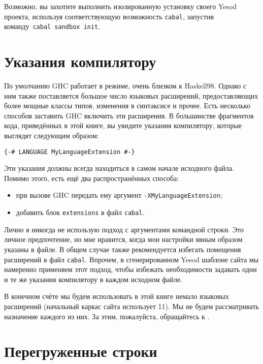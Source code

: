\begin{remark}
    Возможно, вы захотите выполнить изолированную установку своего Yesod
    проекта, используя соответствующую возможность \texttt{cabal}, запустив
    команду~\texttt{cabal~sandbox~init}.
\end{remark}

\section{Указания компилятору}

По умолчанию GHC работает в режиме, очень близком к Haskell98. Однако с ним также поставляется большое число языковых расширений, предоставляющих более мощные классы типов, изменения в синтаксисе и прочее. Есть несколько способов заставить GHC включить эти расширения. В большинстве фрагментов кода, приведённых в этой книге, вы увидите указания компилятору, которые выглядят следующим образом:

\begin{lstlisting}
{-# LANGUAGE MyLanguageExtension #-}
\end{lstlisting}

Эти указания должны всегда находиться в самом начале исходного файла. Помимо этого, есть ещё два распространённых способа:
\begin{itemize}
\item при вызове GHC передать ему аргумент \lstinline'-XMyLanguageExtension';
\item добавить блок \texttt{extensions} в файл \texttt{cabal}.
\end{itemize}

Лично я никогда не использую подход с аргументами командной строки. Это личное предпочтение, но мне нравится, когда мои настройки явным образом указаны в файле. В общем случае также рекомендуется избегать помещения расширений в файл \texttt{cabal}. Впрочем, в сгенерированном Yesod шаблоне сайта мы намеренно применяем этот подход, чтобы избежать необходимости задавать одни и те же указания компилятору в каждом исходном файле.

В конечном счёте мы будем использовать в этой книге немало языковых расширений (начальный каркас сайта использует 11). Мы не будем рассматривать назначение каждого из них. За этим, пожалуйста, обращайтесь к .

\section{Перегруженные строки}


